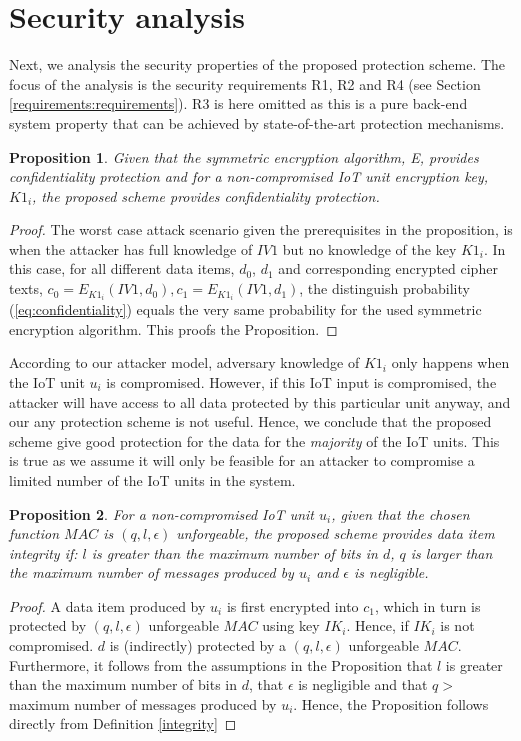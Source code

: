 {\section{Security analysis}
\label{secanalysis}
Next, we analysis the security properties of the proposed protection scheme. The focus of the analysis is the security requirements R1, R2 and R4 (see Section \ref{requirements:requirements}). R3 is here omitted as this is a pure back-end system property that can be achieved by state-of-the-art protection mechanisms.
\newtheorem{prop}{Proposition}
\begin{prop}
\label{analysis:confidentiality}
 Given that the symmetric encryption algorithm, E, provides confidentiality protection and for a non-compromised IoT unit encryption key, $K1_i$, the proposed scheme provides confidentiality protection.
\end{prop}
\begin{proof}
The worst case attack scenario given the prerequisites in the proposition, is when the attacker has full knowledge of $IV1$ but no knowledge of the key $K1_i$. In this case, for all different data items, $d_0$, $d_1$ and corresponding encrypted cipher texts, $c_0=E_{K1_i}(IV1,d_0), c_1=E_{K1_i}(IV1,d_1)$, the distinguish probability (\ref{eq:confidentiality}) equals the very same probability for the used symmetric encryption algorithm. This proofs the Proposition.
\end{proof}
According to our attacker model, adversary knowledge of $K1_i$ only happens when the IoT unit $u_i$ is compromised. However, if this IoT input is compromised, the attacker will have access to all data protected by this particular unit anyway, and our any protection scheme is not useful. Hence, we conclude that the proposed scheme give good protection for the data for the \textit{majority} of the IoT units. This is true as we assume it will only be feasible for an attacker to compromise a limited number of the IoT units in the system.
\begin{prop}
\label{analysis:integrity}
For a non-compromised IoT unit $u_i$, given that the chosen function $MAC$ is $(q,l,\epsilon)$ unforgeable, the proposed scheme provides data item integrity if: $l $ is greater than the maximum number of bits in $d$, $q$ is larger than the maximum number of messages produced by $u_i$ and $\epsilon$ is negligible.
\end{prop}
\begin{proof}
A data item produced by $u_i$ is first encrypted into $c_1$, which in turn is protected by $(q,l,\epsilon)$ unforgeable $MAC$ using key $IK_i$. Hence, if $IK_i$ is not compromised. $d$ is (indirectly) protected by a $(q,l,\epsilon)$ unforgeable $MAC$. Furthermore, it follows from the assumptions in the Proposition that $l$ is greater than the maximum number of bits in $d$, that $\epsilon $ is negligible and that $q >$ maximum number of messages produced by $u_i$. Hence, the Proposition follows directly from Definition \ref{integrity}

\end{proof}}
